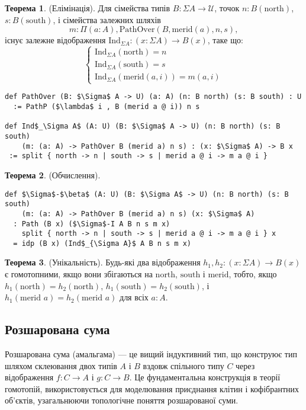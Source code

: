 \documentclass{article}
\theoremstyle{definition}
\newtheorem{theorem}{Теорема}
\begin{document}
\begin{theorem} (Елімінація).
Для сімейства типів \( B : \Sigma A \to \mathcal{U} \), точок \( n : B(\text{north}) \), \( s : B(\text{south}) \), і сімейства
залежних шляхів
\[
  m : \Pi (a : A), \text{PathOver}(B,\text{merid}(a),n,s),
\]
існує залежне відображення \( \text{Ind}_{\Sigma A} : (x : \Sigma A) \to B(x) \), таке що:
\[
\begin{cases}
\text{Ind}_{\Sigma A}(\text{north}) = n \\
\text{Ind}_{\Sigma A}(\text{south}) = s \\
\text{Ind}_{\Sigma A}(\text{merid}(a,i)) = m(a,i)
\end{cases}
\]
\begin{lstlisting}[mathescape=true]
def PathOver (B: $\Sigma$ A -> U) (a: A) (n: B north) (s: B south) : U
  := PathP ($\lambda$ i , B (merid a @ i)) n s

def Ind$_\Sigma A$ (A: U) (B: $\Sigma$ A -> U) (n: B north) (s: B south)
    (m: (a: A) -> PathOver B (merid a) n s) : (x: $\Sigma$ A) -> B x
 := split { north -> n | south -> s | merid a @ i -> m a @ i }
\end{lstlisting}
\end{theorem}

\begin{theorem} (Обчислення).
\begin{lstlisting}[mathescape=true]
def $\Sigma$-$\beta$ (A: U) (B: $\Sigma A$ -> U) (n: B north) (s: B south)
    (m: (a: A) -> PathOver B (merid a) n s) (x: $\Sigma$ A)
  : Path (B x) ($\Sigma$-I A B n s m x)
    split { north -> n | south -> s | merid a @ i -> m a @ i } x
  = idp (B x) (Ind$_{\Sigma A}$ A B n s m x)
\end{lstlisting}
\end{theorem}

\begin{theorem} (Унікальність).
Будь-які два відображення \( h_1, h_2 : (x : \Sigma A) \to B(x) \) є гомотопними, якщо вони збігаються
на \( \text{north} \), \( \text{south} \) і \( \text{merid} \), тобто,
якщо \( h_1(\text{north}) = h_2(\text{north}) \), \( h_1(\text{south}) = h_2(\text{south}) \),
і \( h_1(\text{merid } a) = h_2(\text{merid } a) \) для всіх \( a : A \).
\end{theorem}

\subsection{Розшарована сума}
Розшарована сума (амальгама) — це вищий індуктивний тип, що конструює тип шляхом
склеювання двох типів \( A \) і \( B \) вздовж спільного типу \( C \) через відображення \( f : C \to A \)
і \( g : C \to B \). Це фундаментальна конструкція в теорії гомотопій,
використовується для моделювання приєднання клітин і кофібрантних об’єктів, узагальнюючи
топологічне поняття розшарованої суми.
\end{document}
